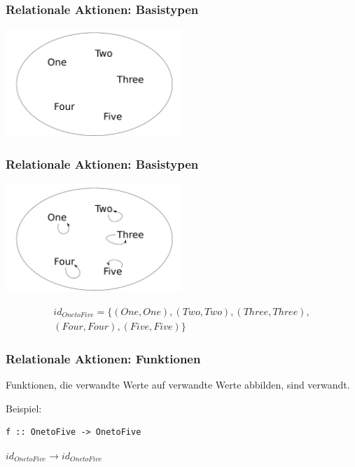 \documentclass{beamer}
\begin{document}

\begin{frame}
\frametitle{Relationale Aktionen: Basistypen}

\begin{center}
\includegraphics[width=250px]{menge-onetofive}
\end{center}

\end{frame}


\begin{frame}
\frametitle{Relationale Aktionen: Basistypen}

\begin{center}
\includegraphics[width=250px]{relation-onetofive}
\end{center}

\pause

\begin{align*}
id_{OnetoFive} = \{ (One, One), (Two, Two), (Three, Three),\\
(Four, Four), (Five, Five) \}
\end{align*}

\end{frame}


\begin{frame}[fragile]
\frametitle{Relationale Aktionen: Funktionen}

Funktionen, die verwandte Werte auf verwandte Werte abbilden, sind verwandt.

\vspace{36px}

Beispiel:

\begin{verbatim}
f :: OnetoFive -> OnetoFive
\end{verbatim}

\pause

$id_{OnetoFive} \rightarrow id_{OnetoFive}$

\end{frame}
\end{document}
